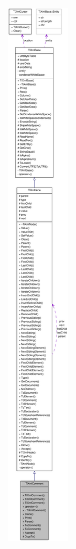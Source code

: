 \begin{figure}[H]
\begin{center}
\leavevmode
\includegraphics[height=400pt]{class_ti_xml_comment__coll__graph}
\end{center}
\end{figure}
